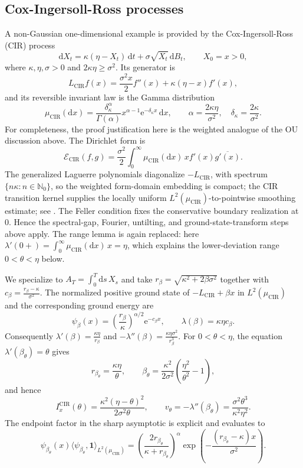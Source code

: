 \documentclass[11pt,reqno]{amsart}
\theoremstyle{definition}
\numberwithin{equation}{section}
\newcommand{\<}{\langle}
\renewcommand{\>}{\rangle}
\def\de{{\rm d}}
\def\de{{\mathrm {d}}}
\begin{document}
\subsection{Cox-Ingersoll-Ross processes}
\label{ex:cir-reference}
A non-Gaussian one-dimensional example is provided by the
Cox-Ingersoll-Ross (CIR) process \cite{CIR}
\[
    \de X_t=\kappa(\eta-X_t)\,\de t
      +\sigma\sqrt{X_t}\,\de B_t,
    \qquad X_0=x>0,
\]
where $\kappa,\eta,\sigma>0$ and $2\kappa\eta\geq\sigma^2$.  Its generator is
\[
    L_{\mathrm{CIR}}f(x)
      =\frac{\sigma^2x}{2}f''(x)+\kappa(\eta-x)f'(x),
\]
and its reversible invariant law is the Gamma distribution
\[
    \mu_{\mathrm{CIR}}(\de x)
      =\frac{\delta_\kappa^\alpha}{\Gamma(\alpha)}
        x^{\alpha-1}\mathrm e^{-\delta_\kappa x}\,\de x,
    \qquad
    \alpha=\frac{2\kappa\eta}{\sigma^2},
    \quad
    \delta_\kappa=\frac{2\kappa}{\sigma^2}.
\]
For completeness, the proof justification here is the weighted analogue of
the OU discussion above.  The Dirichlet form is
\[
    \mathcal E_{\mathrm{CIR}}(f,g)
      =\frac{\sigma^2}{2}\int_0^\infty
        \mu_{\mathrm{CIR}}(\de x)\,x f'(x)\overline{g'(x)}.
\]
The generalized Laguerre polynomials diagonalize $-L_{\mathrm{CIR}}$, with
spectrum $\{n\kappa:n\in\mathbb N_0\}$, so the weighted form-domain
embedding is compact; the CIR transition kernel supplies the locally uniform
$L^2(\mu_{\mathrm{CIR}})$-to-pointwise smoothing estimate; see
\cite[Theorem~6.1]{MendozaLinetsky}.  The Feller condition fixes the
conservative boundary realization at $0$.  
Hence the spectral-gap, Fourier,
untilting, and ground-state-transform steps above apply. 
The range lemma is again replaced: here
$\lambda'(0+)=\int_0 ^\infty \mu_{\mathrm{CIR}}(\de x)\, x=\eta$, which explains the lower-deviation range $0<\theta<\eta$ below.

We specialize to  $A_T=\int_0^T\de s \,  X_s$ and take $r_\beta=\sqrt{\kappa^2+2\beta\sigma^2}$ together with $c_\beta=\frac{r_\beta-\kappa}{\sigma^2}$.
The normalized positive ground state of
$-L_{\mathrm{CIR}}+\beta x$ in $L^2(\mu_{\mathrm{CIR}})$ and the corresponding
ground energy are
\[
    \psi_\beta(x)
      =\left(\frac{r_\beta}{\kappa}\right)^{\alpha/2}
        \mathrm e^{-c_\beta x},
    \qquad
    \lambda(\beta)=\kappa\eta c_\beta.
\]
Consequently $\lambda'(\beta)=\frac{\kappa\eta}{r_\beta}$ and $-\lambda''(\beta)=\frac{\kappa\eta\sigma^2}{r_\beta^3}$.
For $0<\theta<\eta$, the equation $\lambda'(\beta_\theta)=\theta$ gives
\[
    r_{\beta_\theta}=\frac{\kappa\eta}{\theta},
    \qquad
    \beta_\theta
      =\frac{\kappa^2}{2\sigma^2}
        \left(\frac{\eta^2}{\theta^2}-1\right),%
\]
    and hence
\[
    I_x^{\mathrm{CIR}}(\theta)
      =\frac{\kappa^2(\eta-\theta)^2}{2\sigma^2\theta},
    \qquad
    v_\theta = -\lambda''(\beta_\theta)
      =\frac{\sigma^2\theta^3}{\kappa^2\eta^2}.
\]
The endpoint factor in the sharp asymptotic is explicit and evaluates to
\[
    \psi_{\beta_\theta}(x)
    \langle\psi_{\beta_\theta},\mathbf 1\rangle_{L^2(\mu_{\mathrm{CIR}})}
      =\left(\frac{2r_{\beta_\theta}}
                    {\kappa+r_{\beta_\theta}}\right)^\alpha
        \exp\!\left(-\frac{(r_{\beta_\theta}-\kappa)x}{\sigma^2}\right).
\]
\end{document}
